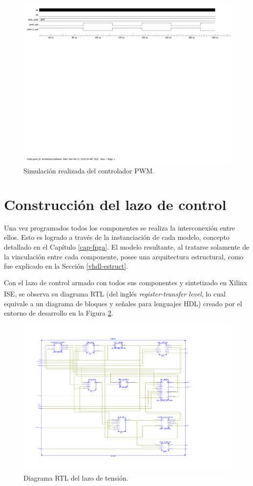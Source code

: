 \begin{figure}[hbt!]
    \centering
    \includegraphics[width=0.85\columnwidth]{Imágenes/Controlador PWM/Simulación en ModelSim.pdf}    
    \caption{Simulación realizada del controlador PWM.}
    \label{simulacion-pwm}
\end{figure} 

\section{Construcción del lazo de control}

Una vez programados todos los componentes se realiza la interconexión entre ellos. Esto es logrado a través de la instanciación de cada modelo, concepto detallado en el Capítulo \ref{cap-fpga}. El modelo resultante, al tratarse solamente de la vinculación entre cada componente, posee una arquitectura estructural, como fue explicado en la Sección \ref{vhdl-estruct}.

Con el lazo de control armado con todos sus componentes y sintetizado en Xilinx ISE\textsuperscript\textregistered\hspace{0.05pt}, se observa su diagrama RTL (del inglés \emph{register-transfer level}, lo cual equivale a un diagrama de bloques y señales para lenguajes HDL) creado por el entorno de desarrollo en la Figura \ref{rtl-lazo}.

\begin{figure}[hbt!]
    \centering
    \includegraphics[width=0.65\columnwidth]{Imágenes/Diagrama RTL del lazo de tensión.pdf}    
    \caption{Diagrama RTL del lazo de tensión.}
    \label{rtl-lazo}
\end{figure} 

